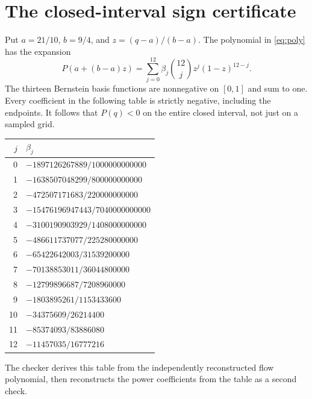 \documentclass[11pt,a4paper]{article}
\theoremstyle{remark}\newtheorem{remark}[theorem]{Remark}
\begin{document}
\section{The closed-interval sign certificate}\label{app:bernstein}
Put $a=21/10$, $b=9/4$, and $z=(q-a)/(b-a)$. The polynomial in \eqref{eq:poly} has the expansion
\[
P(a+(b-a)z)=\sum_{j=0}^{12}\beta_j\binom{12}{j}z^j(1-z)^{12-j}.
\]
The thirteen Bernstein basis functions are nonnegative on $[0,1]$ and sum to one. Every coefficient in the following table is strictly negative, including the endpoints. It follows that $P(q)<0$ on the entire closed interval, not just on a sampled grid.
\begingroup\renewcommand{\arraystretch}{1.8}
\begin{center}
\begin{tabular}{r@{\qquad}l}
\toprule
$j$ & $\beta_j$\\
\midrule
0 & $-1897126267889/1000000000000$\\
1 & $-1638507048299/800000000000$\\
2 & $-472507171683/220000000000$\\
3 & $-15476196947443/7040000000000$\\
4 & $-3100190903929/1408000000000$\\
5 & $-486611737077/225280000000$\\
6 & $-65422642003/31539200000$\\
7 & $-70138853011/36044800000$\\
8 & $-12799896687/7208960000$\\
9 & $-1803895261/1153433600$\\
10 & $-34375609/26214400$\\
11 & $-85374093/83886080$\\
12 & $-11457035/16777216$\\
\bottomrule
\end{tabular}
\end{center}\endgroup
The checker derives this table from the independently reconstructed flow polynomial, then reconstructs the power coefficients from the table as a second check.
\end{document}
